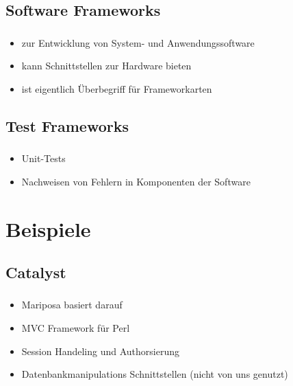 \documentclass[aspectratio=169,14pt,xcolor=dvipsnames]{beamer}
\begin{document}
\subsection{Software Frameworks}
\begin{frame}[t]
    \frametitle{\subsecname}
    \framesubtitle{\secname}
    \begin{itemize}
        \setlength{\itemsep}{1.5em}
        \item zur Entwicklung von System- und Anwendungssoftware
        \item kann Schnittstellen zur Hardware bieten
        \item ist eigentlich Überbegriff für Frameworkarten
    \end{itemize}
\end{frame}

\subsection{Test Frameworks}
\begin{frame}[t]
    \frametitle{\subsecname}
    \framesubtitle{\secname}
    \begin{itemize}
        \setlength{\itemsep}{1.5em}
        \item Unit-Tests
        \item Nachweisen von Fehlern in Komponenten der Software
    \end{itemize}
\end{frame}

\section{Beispiele}
\subsection{Catalyst}
\begin{frame}[t]
    \frametitle{\subsecname}
    \framesubtitle{\secname}
    \begin{itemize}
        \setlength{\itemsep}{1.5em}
        \item Mariposa basiert darauf
        \item MVC Framework für Perl
        \item Session Handeling und Authorsierung
        \item Datenbankmanipulations Schnittstellen (nicht von uns genutzt)
    \end{itemize}
\end{frame}
\end{document}
